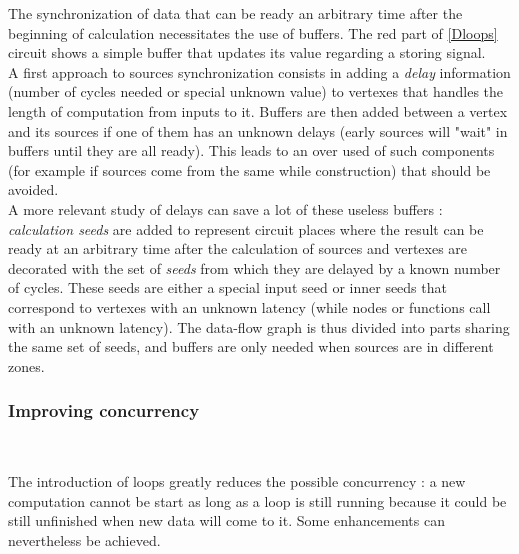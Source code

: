 \documentclass[10pt,a4paper]{article}
\renewcommand{\indent}{~\\\vspace{-.8cm}}
\begin{document}
The synchronization of data that can be ready an arbitrary time after the beginning of calculation necessitates the use of buffers. The red part of \autoref{Dloops} circuit shows a simple buffer that updates its value regarding a storing signal. \\


A first approach to sources synchronization consists in adding a \textit{delay} information (number of cycles needed or special unknown value) to vertexes that handles the length of computation from inputs to it. Buffers are then added between a vertex and its sources if one of them has an unknown delays (early sources will "wait" in buffers until they are all ready). This leads to an over used of such components (for example if sources come from the same while construction) that should be avoided. \\


A more relevant study of delays can save a lot of these useless buffers : \textit{calculation seeds} are added to represent circuit places where the result can be ready at an arbitrary time after the calculation of sources and vertexes are decorated with the set of \textit{seeds} from which they are delayed by a known number of cycles. These seeds are either a special input seed or inner seeds that correspond to vertexes with an unknown latency (while nodes or functions call with an unknown latency). The data-flow graph is thus divided into parts sharing the same set of seeds, and buffers are only needed when sources are in different zones.



\subsubsection{Improving concurrency} \indent

The introduction of loops greatly reduces the possible concurrency : a new computation cannot be start as long as a loop is still running because it could be still unfinished when new data will come to it. Some enhancements can nevertheless be achieved.




\end{document}
